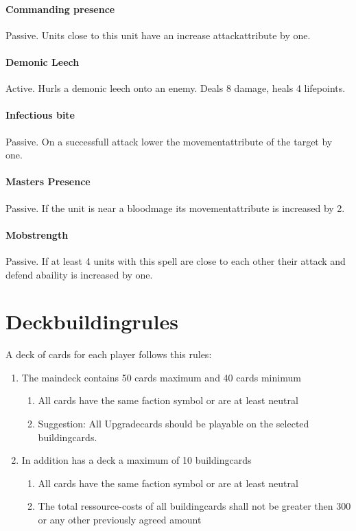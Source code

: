 \documentclass[a5paper,pagesize,10pt,bibtotoc,pointlessnumbers,
normalheadings,DIV=9,twoside=false]{scrbook}
\begin{document}
\subsubsection{Commanding presence}
Passive. Units close to this unit have an increase attackattribute by one.

\subsubsection{Demonic Leech}
Active. Hurls a demonic leech onto an enemy. Deals 8 damage, heals 4 lifepoints.

\subsubsection{Infectious bite}
Passive. On a successfull attack lower the movementattribute of the target by one.

\subsubsection{Masters Presence}
Passive. If the unit is near a bloodmage its movementattribute is increased by 2.

\subsubsection{Mobstrength}
Passive. If at least 4 units with this spell are close to each other their attack and defend abaility is increased by one.



\chapter{Deckbuildingrules}

A deck of cards for each player follows this rules:

\begin{enumerate}
\item The maindeck contains 50 cards maximum and 40 cards minimum
\begin{enumerate}
\item All cards have the same faction symbol or are at least neutral
\item Suggestion: All Upgradecards should be playable on the selected buildingcards.
\end{enumerate}
\item In addition has a deck a maximum of 10 buildingcards
\begin{enumerate}
\item All cards have the same faction symbol or are at least neutral
\item The total ressource-costs of all buildingcards shall not be greater then 300 or any other previously agreed amount
\end{enumerate}
\end{enumerate}
\end{document}
